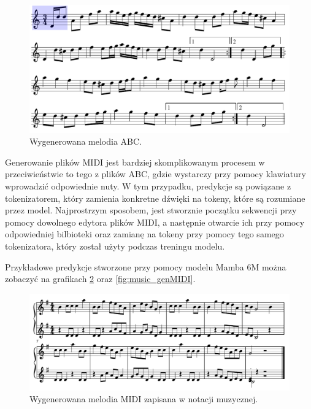 \documentclass[data-science]{agh-wi} %
\begin{document}
\begin{figure}[ht!]
    \begin{center}
        \includegraphics[width=0.9\linewidth]{./img/abc_gen_nice1.pdf}
    \end{center}
    \caption{Wygenerowana melodia ABC.}\label{fig:music_gen1}
\end{figure}

Generowanie plików MIDI jest bardziej skomplikowanym procesem w przeciwieństwie to tego z plików ABC, gdzie wystarczy przy pomocy klawiatury wprowadzić odpowiednie nuty. W tym przypadku, predykcje są powiązane z tokenizatorem, który zamienia konkretne dźwięki na tokeny, które są rozumiane przez model. Najprostrzym sposobem, jest stworznie początku sekwencji przy pomocy dowolnego edytora plików MIDI, a następnie otwarcie ich przy pomocy odpowiedniej bilbioteki oraz zamianę na tokeny przy pomocy tego samego tokenizatora, który został użyty podczas treningu modelu.

Przykładowe predykcje stworzone przy pomocy modelu Mamba 6M można zobaczyć na grafikach \ref*{fig:music_genMIDI_notes} oraz \ref*{fig:music_genMIDI}.

\begin{figure}[ht!]
    \begin{center}
        \includegraphics[width=0.9\linewidth]{./img/35.pdf}
    \end{center}
    \caption{Wygenerowana melodia MIDI zapisana w notacji muzycznej.}\label{fig:music_genMIDI_notes}
\end{figure}
\end{document}
